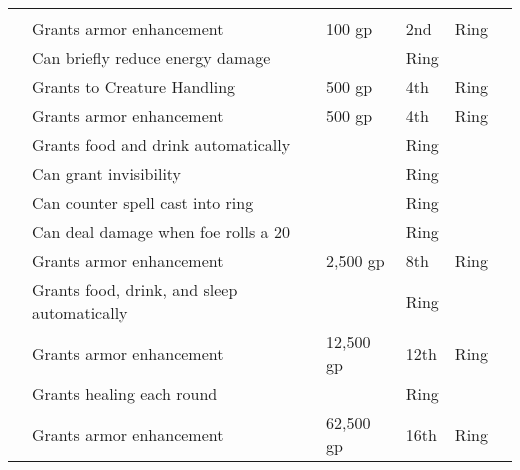 \begin{longtabuwrapper}
\begin{longtabu}{l X l l l l}
                \midrule
                 &  &  &  &  &  \\
                  & Grants  armor enhancement & 100 gp & 2nd & Ring &  \\
                 & Can briefly reduce energy damage &  & Ring &  \\
                 & Grants  to Creature Handling & 500 gp & 4th & Ring &  \\
                  & Grants  armor enhancement & 500 gp & 4th & Ring &  \\
                 & Grants food and drink automatically &  & Ring &  \\
                 & Can grant invisibility &  & Ring &  \\
                 & Can counter spell cast into ring &  & Ring &  \\
                 & Can deal damage when foe rolls a 20 &  & Ring &  \\
                  & Grants  armor enhancement & 2,500 gp & 8th & Ring &  \\
                 & Grants food, drink, and sleep automatically &  & Ring &  \\
                  & Grants  armor enhancement & 12,500 gp & 12th & Ring &  \\
                 & Grants healing each round &  & Ring &  \\
                  & Grants  armor enhancement & 62,500 gp & 16th & Ring &  \\


\end{longtabu}
\end{longtabuwrapper}
